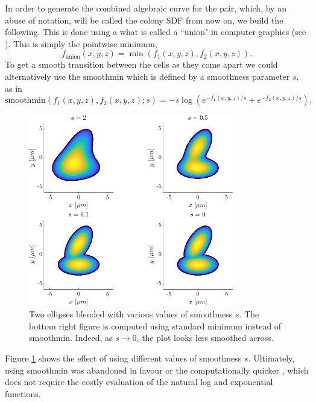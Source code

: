 In order to generate 
the combined algebraic curve for the pair, which, by an abuse of notation, will 
be called the colony SDF from now on, we build the following.
This is done using a what is called a ``union" in computer graphics
(see \cite{fusekvisualization}). This is simply the pointwise minimum,
\begin{equation*}
    f_{\textrm{union}}(x,y,z) = \min(f_1(x,y,z), f_2(x,y,z)).
\end{equation*} 
To get a smooth transition between the cells as they come apart we could alternatively use 
the $\textrm{smoothmin}$ which is defined by a smoothness parameter $s$, as in
\begin{equation*}
    \textrm{smoothmin}(f_1(x,y,z), f_2(x,y,z); s) = -s \log(e^{-f_1(x,y,z)/s} + e^{-f_2(x,y,z)/s}).
\end{equation*}
\begin{figure}[!htb]
    \centering
    \includegraphics[width=0.8\textwidth]{chapter1/figures/compareSmoothness.pdf}
    \caption{Two ellipses blended with various values of smoothness $s$. The bottom right 
             figure is computed using standard minimum instead of smoothmin. Indeed,
             as $s \rightarrow 0$, the plot looks less smoothed across.}
    \label{fig:compareSmoothness}
\end{figure}
Figure \ref{fig:compareSmoothness} shows the effect of using different values of smoothness
$s$. Ultimately, using smoothmin was abandoned in favour or the computationally quicker ,
which does not require the costly evaluation of the natural log and exponential functions.
\\

